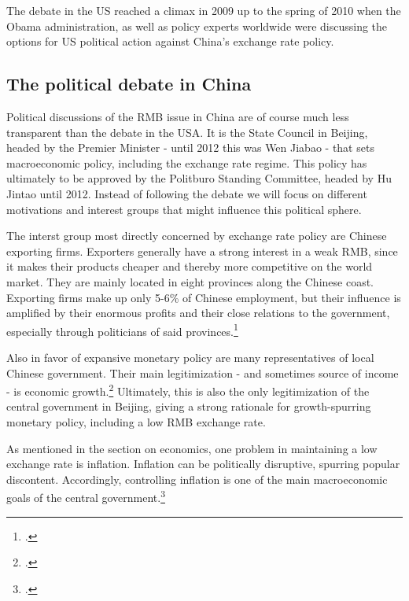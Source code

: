 
The debate in the US reached a climax in 2009 up to the spring of 2010 when the Obama administration, as well as policy experts worldwide were discussing the options for US political action against China's exchange rate policy.

\subsection{The political debate in China}

Political discussions of the RMB issue in China are of course much less transparent than the debate in the USA. It is the State Council in Beijing, headed by the Premier Minister - until 2012 this was Wen Jiabao - that sets macroeconomic policy, including the exchange rate regime. This policy has ultimately to be approved by the Politburo Standing Committee, headed by Hu Jintao until 2012. Instead of following the debate we will focus on different motivations and interest groups that might influence this political sphere.

The interst group most directly concerned by exchange rate policy are Chinese exporting firms. Exporters generally have a strong interest in a weak RMB, since it makes their products cheaper and thereby more competitive on the world market. They are mainly located in eight provinces along the Chinese coast. Exporting firms make up only 5-6\% of Chinese employment, but their influence is amplified by their enormous profits and their close relations to the government, especially through politicians of said provinces.\footnote{\cite[p. 202]{Breslin2010}.} 

Also in favor of expansive monetary policy are many representatives of local Chinese government. Their main legitimization - and sometimes source of income - is economic growth.\footnote{\cite[pp. 19]{Levy2011}.} Ultimately, this is also the only legitimization of the central government in Beijing, giving a strong rationale for growth-spurring monetary policy, including a low RMB exchange rate.

As mentioned in the section on economics, one problem in maintaining a low exchange rate is inflation. Inflation can be politically disruptive, spurring popular discontent. Accordingly, controlling inflation is one of the main macroeconomic goals of the central government.\footnote{\cite{Naugthon2011}.}


